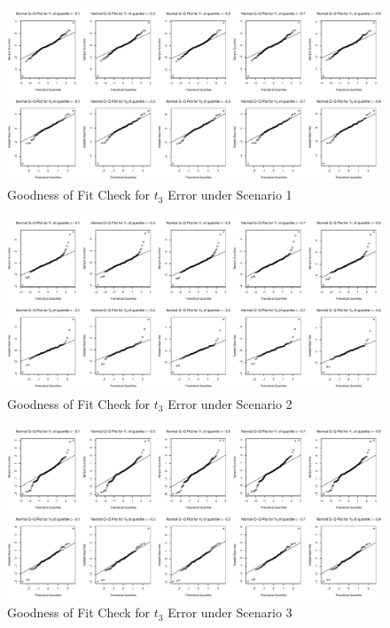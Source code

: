 \documentclass{article}
\begin{document}
\begin{figure}[h]
\centerline{\includegraphics[scale=.4]{../image/T3S1}}
\caption{Goodness of Fit Check for $t_3$ Error under Scenario 1}
\end{figure}

\begin{figure}[h]
\centerline{\includegraphics[scale=.4]{../image/T3S2}}
\caption{Goodness of Fit Check for $t_3$ Error under Scenario 2}
\end{figure}

\begin{figure}[h]
\centerline{\includegraphics[scale=.4]{../image/T3S3}}
\caption{Goodness of Fit Check for $t_3$ Error under Scenario 3}
\end{figure}
\end{document}
